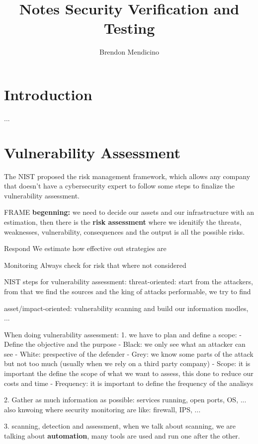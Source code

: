 \documentclass[12pt]{article}
\title{Notes Security Verification and Testing}
\author{Brendon Mendicino}
\begin{document}
\maketitle
\newpage
\tableofcontents
\newpage

\section{Introduction}
... 

\section{Vulnerability Assessment}
The NIST proposed the risk management framework, which allows any company that doesn't have a cybersecurity expert to follow some steps to finalize the vulnerability assessment.

FRAME 
\textbf{begenning:} we need to decide our assets and our infrastructure with an estimation, then there is the \textbf{risk assessment} where we idenitify the threats, weaknesses, vulnerability, consequences and the output is all the possible risks.

Respond
We estimate how effective out strategies are

Monitoring
Always check for risk that where not considered

NIST steps for vulnerability assessment:
threat-oriented: start from the attackers, from that we find the sources and the king of attacks performable, we try to find 

asset/impact-oriented: vulnerability scanning and build our information modles, ...

When doing vulnerability assessment:
1. we have to plan and define a scope:
- Define the objective and the purpose
- Black: we only see what an attacker can see
- White: prespective of the defender
- Grey: we know some parts of the attack but not too much (usually when we rely on a third party company)
- Scope: it is important the define the scope of what we want to assess, this done to reduce our costs and time
- Frequency: it is important to define the frequency of the analisys

2.
Gather as much information as possible:
services running, open ports, OS, ... also knwoing where security monitoring are like: firewall, IPS, ...

3.
scanning, detection and assessment,
when we talk about scanning, we are talking about \textbf{automation}, many tools are used and run one after the other.
\end{document}
